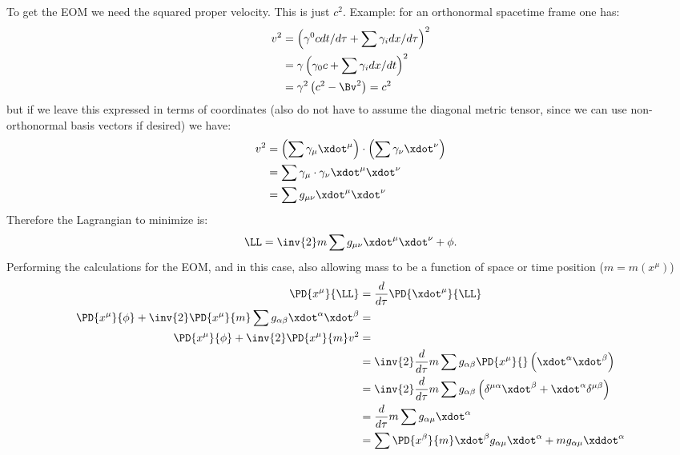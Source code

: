 To get the EOM we need the squared proper velocity.  This is just \(c^2\).  Example: for an orthonormal spacetime frame one has:
%
\begin{equation}\label{eqn:massVaryLagrangian:60}
\begin{aligned}
v^2 &=
\left(\gamma^0 c dt/d\tau + \sum \gamma_i dx/d\tau\right)^2  \\
&= \gamma \left(\gamma_0 c + \sum \gamma_i dx/dt\right)^2 \\
&= \gamma^2 \left(c^2 - \Bv^2\right) = c^2
\end{aligned}
\end{equation}
%
but if we leave this expressed in terms of coordinates (also do not have to assume the diagonal metric tensor, since we can use non-orthonormal basis vectors if desired) we have:
%
\begin{equation}\label{eqn:massVaryLagrangian:80}
\begin{aligned}
v^2
&= \left(\sum \gamma_{\mu} \xdot^{\mu}\right) \cdot \left(\sum \gamma_{\nu} \xdot^{\nu}\right) \\
&= \sum \gamma_{\mu} \cdot \gamma_{\nu} \xdot^{\mu} \xdot^{\nu} \\
&= \sum g_{\mu\nu} \xdot^{\mu} \xdot^{\nu}
\end{aligned}
\end{equation}
%
Therefore the Lagrangian to minimize is:
%
\begin{equation}
\LL = \inv{2} m \sum g_{\mu\nu} \xdot^{\mu} \xdot^{\nu} + \phi.
\end{equation}
%
Performing the calculations for the EOM, and in this case, also allowing mass to be a function of space or time position (\(m = m(x^{\mu})\))
%
\begin{equation}\label{eqn:massVaryLagrangian:100}
\begin{aligned}
\PD{x^{\mu}}{\LL} &= \frac{d}{d\tau} \PD{\xdot^{\mu}}{\LL} \\
\PD{x^{\mu}}{\phi} + \inv{2} \PD{x^{\mu}}{m} \sum g_{\alpha\beta} \xdot^{\alpha} \xdot^{\beta} &= \\
\PD{x^{\mu}}{\phi} + \inv{2} \PD{x^{\mu}}{m} v^2 &= \\
&= \inv{2} \frac{d}{d\tau} m \sum g_{\alpha\beta} \PD{x^{\mu}}{}\left(\xdot^{\alpha} \xdot^{\beta}\right) \\
&= \inv{2} \frac{d}{d\tau} m \sum g_{\alpha\beta} \left(\delta^{\mu\alpha} \xdot^{\beta} + \xdot^{\alpha} \delta^{\mu\beta}\right) \\
&= \frac{d}{d\tau} m \sum g_{\alpha\mu} \xdot^{\alpha} \\
&= \sum \PD{x^{\beta}}{m} \xdot^{\beta} g_{\alpha\mu} \xdot^{\alpha} + m g_{\alpha\mu} \xddot^{\alpha} \\
\end{aligned}
\end{equation}
